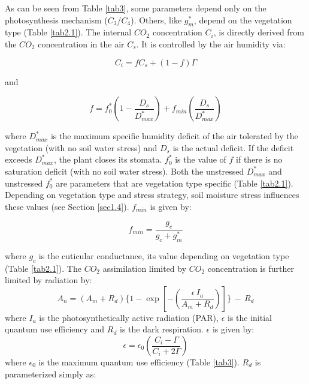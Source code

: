 {As can be seen from Table \ref{tab3}, some parameters depend only on the photosynthesis mechanism
($C_{3}$/$C_{4}$). Others, like $g_{m}^{*}$, depend on the vegetation type (Table \ref{tab2.1}).
The internal $CO_{2}$ concentration $C_{i}$, is directly derived from the $CO_{2}$ concentration in the air $C_{s}$. It is
controlled by the air humidity via:

\begin{equation}
C_{i} = fC_{s}+(1-f)\Gamma
\end{equation}

and

\begin{equation}
f=f_{0}^{*} \left ( 1-\frac{D_{s}}{D_{max}^{*}} \right ) + f_{min} \left ( \frac{D_{s}}{D_{max}^{*}} \right )
\end{equation}

where $D_{max}^{*}$ is the maximum specific humidity deficit of the air tolerated by the vegetation (with no soil
water stress) and $D_{s}$ is the actual deficit. If the deficit exceeds $D_{max}^{*}$, the plant closes its stomata. $f_{0}^{*}$ is
the value of $f$ if there is no saturation deficit (with no soil water stress). Both the unstressed $D_{max}^{*}$ and
unstressed $f_{0}^{*}$ are parameters that are vegetation type specific (Table \ref{tab2.1}). Depending on vegetation
type and stress strategy, soil moisture stress influences these values (see Section \ref{sec1.4}). $f_{min}$ is given
by:

\begin{equation}
f_{min} = \frac{g_{c}}{g_{c}+g_{m}^{*}}
\end{equation}

where $g_{c}$ is the cuticular conductance, its value depending on vegetation type (Table \ref{tab2.1}).
The $CO_{2}$ assimilation limited by $CO_{2}$ concentration is further limited by radiation by:
%
\begin{equation}
A_{n} = \left(A_{m}+R_{d}\right)
\Bigg\lbrace
1-\exp \left[ - \left(\frac{\epsilon \,
I_{a}}{A_{m}+R_{d}}\right) \right] 
\Bigg\rbrace \,-\, R_{d}
\end{equation}
%
where $I_{a}$ is the photosynthetically active radiation (PAR), $\epsilon$ is the initial quantum use efficiency
and $R_{d}$ is the dark respiration. $\epsilon$ is given by:
%
\begin{equation}
\epsilon = \epsilon_{0} \left( \frac{C_{i}-\Gamma}{C_{i}+2\Gamma} \right)
\end{equation}
%
where $\epsilon_{0}$ is the maximum quantum use efficiency (Table \ref{tab3}). $R_{d}$ is parameterized simply as:

}
